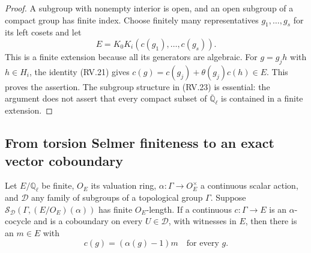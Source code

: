 \begin{proof}
A subgroup with nonempty interior is open, and an open subgroup
of a compact group has finite index.
Choose finitely many representatives $g_1,\ldots,g_s$ for its
left cosets and let
\[
                    E=K_0K_i(c(g_1),\ldots,c(g_s)).
 \tag{RV.24}
\]
This is a finite extension because all its generators are algebraic.
For $g=g_jh$ with $h\in H_i$, the identity (RV.21) gives
$c(g)=c(g_j)+\theta(g_j)c(h)\in E$.
This proves the assertion.
The subgroup structure in (RV.23) is essential: the argument
does not assert that every compact subset of
$\overline{\mathbb Q}_\ell$ is contained in a finite extension.
\end{proof}

\subsection{From torsion Selmer finiteness to an exact vector coboundary}

\begin{proposition}
\label{claim:RV5}
Let $E/\mathbb Q_\ell$ be finite, $O_E$ its valuation ring,
$\alpha:\Gamma\to O_E^\times$ a continuous scalar action, and
$\mathscr D$ any family of subgroups of a topological group $\Gamma$.
Suppose
$\mathcal S_{\mathscr D}(\Gamma,(E/O_E)(\alpha))$
has finite $O_E$-length.
If a continuous $c:\Gamma\to E$ is an $\alpha$-cocycle and is
a coboundary on every $U\in\mathscr D$, with witnesses in $E$,
then there is an $m\in E$ with
\[
                         c(g)=(\alpha(g)-1)m
                         \quad\text{for every }g.
 \tag{RV.25}
\]
\end{proposition}

